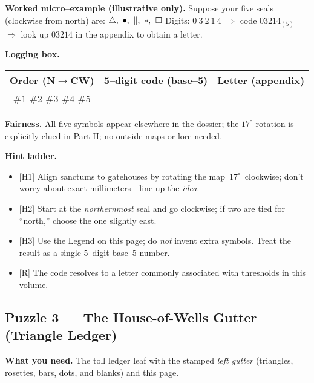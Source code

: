 \documentclass[11pt]{article}
\begin{document}
\begin{itemize}
\medskip
\noindent\textbf{Worked micro–example (illustrative only).}  
Suppose your five seals (clockwise from north) are: \(\triangle,\ \bullet,\ \Vert,\ \large\ast,\ \square\)  
Digits: \(0\ 3\ 2\ 1\ 4\) \(\Rightarrow\) code \(03214_{(5)}\) \(\Rightarrow\) look up \(03214\) in the appendix to obtain a letter.

\medskip
\noindent\textbf{Logging box.}
\begin{center}
\begin{tabular}{c|c|c}
\textbf{Order (N\(\rightarrow\)CW)} & \textbf{5–digit code (base–5)} & \textbf{Letter (appendix)} \\
\hline
\(\#1\) \(\#2\) \(\#3\) \(\#4\) \(\#5\) & \hspace{3.5cm} & \hspace{1.2cm} \\
\end{tabular}
\end{center}

\medskip
\noindent\textbf{Fairness.} All five symbols appear elsewhere in the dossier; the \(17^\circ\) rotation is explicitly clued in Part II; no outside maps or lore needed.

\medskip
\noindent\textbf{Hint ladder.}
\begin{itemize}\setlength\itemsep{0.25em}
  \item \textsc{[H1]} Align sanctums to gatehouses by rotating the map \(\,17^\circ\,\) clockwise; don’t worry about exact millimeters—line up the \emph{idea}.
  \item \textsc{[H2]} Start at the \emph{northernmost} seal and go clockwise; if two are tied for “north,” choose the one slightly east.
  \item \textsc{[H3]} Use the Legend on this page; do \emph{not} invent extra symbols. Treat the result as a single 5–digit base–5 number.
  \item \textsc{[R]} The code resolves to a letter commonly associated with thresholds in this volume.
\end{itemize}

\subsection{Puzzle 3 — The House-of-Wells Gutter (Triangle Ledger)}
\label{pz:triangle-ledger}
{}

\noindent\textbf{What you need.} The toll ledger leaf with the stamped \emph{left gutter} (triangles, rosettes, bars, dots, and blanks) and this page.


\end{itemize}
\end{document}
